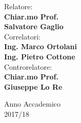 \documentclass[12pt, oneside]{book}
\let\cleardoublepage\clearpage  %
\theoremstyle{definition}
\theoremstyle{plain}
\begin{document}
\begin{titlepage}
\begin{minipage}[t]{0.70\textwidth}
{}
\end{minipage}
\begin{minipage}[t]{0.47\textwidth}\raggedright
{\large Relatore:\\
\vspace{3mm}
\textbf{Chiar.mo Prof.}\\ \textbf{Salvatore Gaglio}\\
\vspace{5mm}
Correlatori:\\
\vspace{3mm}
\textbf{Ing. Marco Ortolani}\\
\vspace{3mm}
\textbf{Ing. Pietro Cottone}\\
\vspace{5mm}
Controrelatore:\\
\vspace{3mm}
\textbf{Chiar.mo Prof.}\\ \textbf{Giuseppe Lo Re}
}
\end{minipage}
\hfill
\vspace{6mm}
\begin{center}
{\large Anno Accademico\\2017/18 }%
\end{center}
\end{titlepage}


\frontmatter %

\cleardoublepage
{}
{}


\tableofcontents
\listoffigures
\listoftables




\end{document}
